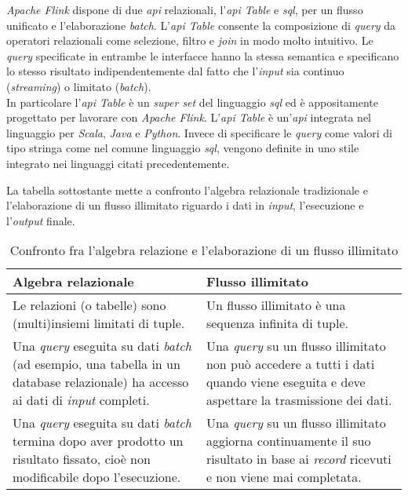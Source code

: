 \textit{Apache Flink} dispone di due \textit{\gls{api}} relazionali, l'\textit{\textit{\gls{api}} Table} e \textit{\textit{\gls{sql}}}, per un flusso unificato e l'elaborazione \textit{batch}. L'\textit{\textit{\gls{api}} Table} consente la composizione di \textit{\gls{query}} da operatori relazionali come selezione, filtro e \textit{join} in modo molto intuitivo. Le \textit{\gls{query}} specificate in entrambe le interfacce hanno la stessa semantica e specificano lo stesso risultato indipendentemente dal fatto che l'\textit{input} sia continuo (\textit{streaming}) o limitato (\textit{batch}).\\
In particolare l'\textit{\textit{\gls{api}} Table} è un \textit{super set} del linguaggio \textit{\gls{sql}} ed è appositamente progettato per lavorare con \textit{Apache Flink}. L'\textit{\textit{\gls{api}} Table} è un'\textit{\gls{api}} integrata nel linguaggio per \textit{Scala}, \textit{Java} e \textit{Python}. Invece di specificare le \textit{\gls{query}} come valori di tipo stringa come nel comune linguaggio \textit{\gls{sql}}, vengono definite in uno stile integrato nei linguaggi citati precedentemente.

La tabella sottostante mette a confronto l'algebra relazionale tradizionale e l'elaborazione di un flusso illimitato riguardo i dati in \textit{input}, l'esecuzione e l'\textit{output} finale.

\begin{table}[H]
\caption{Confronto fra l'algebra relazione e l'elaborazione di un flusso illimitato}
\label{tab:algebraRelazionale-flussoIllimitato}
\begin{tabularx}{\textwidth}{XX}
\hline
\textbf{Algebra relazionale} & \textbf{Flusso illimitato}\\
\hline
Le relazioni (o tabelle) sono (multi)insiemi limitati di tuple.     & Un flusso illimitato è una sequenza infinita di tuple. \\
\hline
Una \textit{\gls{query}} eseguita su dati \textit{batch} (ad esempio, una tabella in un database relazionale) ha accesso ai dati di \textit{input} completi.    & Una \textit{\gls{query}} su un flusso illimitato non può accedere a tutti i dati quando viene eseguita e deve aspettare la trasmissione dei dati. \\
\hline
Una \textit{\gls{query}} eseguita su dati \textit{batch} termina dopo aver prodotto un risultato fissato, cioè non modificabile dopo l'esecuzione. & Una \textit{\gls{query}} su un flusso illimitato aggiorna continuamente il suo risultato in base ai \textit{record} ricevuti e non viene mai completata. \\
\hline
\end{tabularx}
\end{table}%

